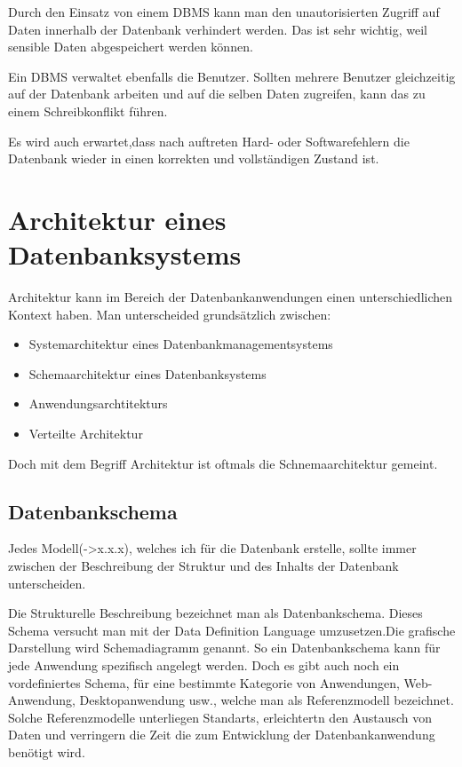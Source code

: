 \begin{flushleft}
 Durch den Einsatz von einem DBMS kann man den unautorisierten Zugriff auf Daten innerhalb der Datenbank verhindert werden. Das ist sehr wichtig, weil sensible Daten abgespeichert werden können.
 
Ein DBMS verwaltet ebenfalls die Benutzer. Sollten mehrere Benutzer gleichzeitig auf der Datenbank arbeiten und auf die selben Daten zugreifen, kann das zu einem Schreibkonflikt führen.

Es wird auch erwartet,dass nach auftreten Hard- oder Softwarefehlern die Datenbank wieder in einen korrekten und vollständigen Zustand ist.  

\section {Architektur eines Datenbanksystems}

Architektur kann im Bereich der Datenbankanwendungen einen unterschiedlichen Kontext haben. Man unterscheided grundsätzlich zwischen:
\begin{itemize}
    \item Systemarchitektur eines Datenbankmanagementsystems
\end{itemize}
\begin{itemize}
    \item Schemaarchitektur eines Datenbanksystems
\end{itemize}
\begin{itemize}
    \item Anwendungsarchtitekturs
\end{itemize}
\begin{itemize}
    \item Verteilte Architektur
\end{itemize}

 Doch mit dem Begriff Architektur ist oftmals die Schnemaarchitektur gemeint.

\subsection{Datenbankschema}

Jedes Modell(->x.x.x), welches ich für die Datenbank erstelle, sollte immer zwischen der Beschreibung der Struktur und des Inhalts der Datenbank unterscheiden.

Die Strukturelle Beschreibung bezeichnet man als Datenbankschema. Dieses Schema versucht man mit der Data Definition Language umzusetzen.Die grafische Darstellung wird Schemadiagramm genannt.
So ein Datenbankschema kann für jede Anwendung spezifisch angelegt werden. Doch es gibt auch noch ein vordefiniertes Schema, für eine bestimmte Kategorie von Anwendungen, Web-Anwendung, Desktopanwendung usw., welche man als Referenzmodell bezeichnet. Solche Referenzmodelle unterliegen Standarts, erleichtertn den Austausch von Daten und verringern die Zeit die zum Entwicklung der Datenbankanwendung benötigt wird. 


\end{flushleft}

